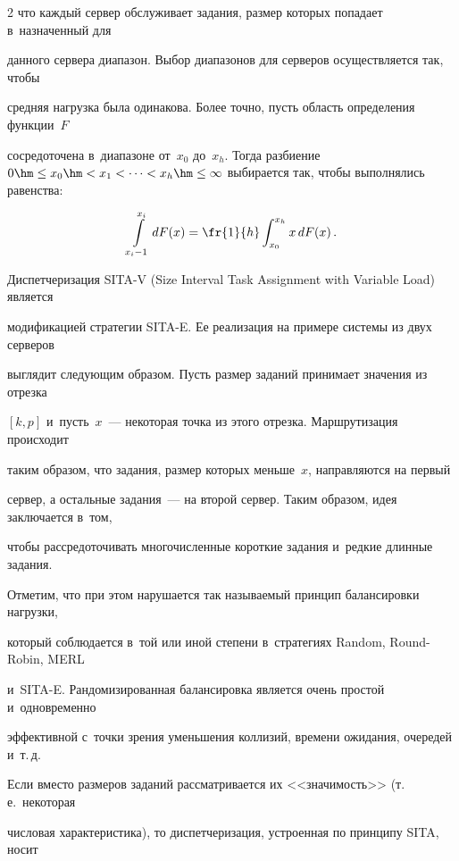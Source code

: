\begin{multicols}{2}
что каждый сервер обслуживает задания, размер которых попадает в~назначенный для 


данного сервера диапазон. Выбор диапазонов для серверов осуществляется так, чтобы 


средняя нагрузка была одинакова. Более точно, пусть область определения функции~$F$ 


сосредоточена в~диапазоне от~$x_0$ до~$x_h$. Тогда разбиение $0\hm\leq x_0\hm< 


x_1<\cdots < x_h\hm\leq \infty$ выбирается так, чтобы выполнялись равенства: 


    $$


    \int\limits_{x_i-1}^{x_i} dF(x) =\fr{1}{h} \int_{x_0}^{x_h} x\,dF(x)\,.


    $$


    


    Диспетчеризация SITA-V (Size Interval Task Assignment with Variable Load) является 


модификацией стратегии SITA-E. Ее реализация на примере системы из двух серверов 


выглядит следующим образом. Пусть размер заданий принимает значения из отрезка 


$[k,p]$ и~пусть~$x$~--- некоторая точка из этого отрезка. Маршрутизация происходит 


таким образом, что задания, размер которых меньше~$x$, на\-прав\-ля\-ют\-ся на первый 


сервер, а остальные задания~--- на второй сервер. Таким образом, идея заключается в~том, 


чтобы рассредоточивать многочисленные короткие задания и~редкие длинные задания. 


Отметим, что при этом нарушается так называемый принцип балансировки нагрузки, 


который соблюдается в~той или иной степени в~стратегиях Random, Round-Robin, MERL 


и~SITA-E. Рандомизированная балансировка является очень простой и~одновременно 


эффективной с~точки зрения уменьшения коллизий, времени ожидания, очередей и~т.\,д.


    


    Если вместо размеров заданий рассматривается их <<значимость>> (т.\,е.\ некоторая 


числовая характеристика), то диспетчеризация, устроенная по принципу SITA, носит 



\end{multicols}
